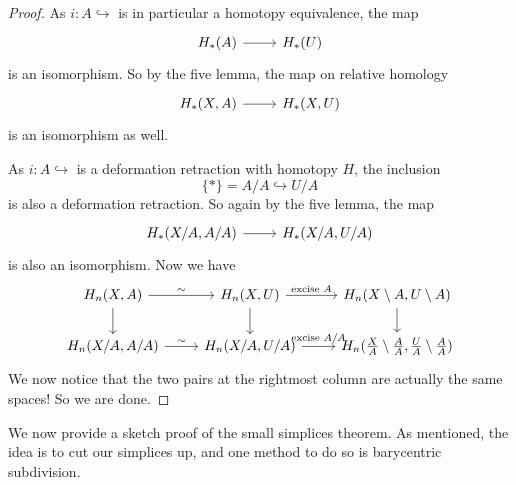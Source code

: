 \documentclass[a4paper]{article}
\begin{document}
\begin{proof}
  As $i: A \hookrightarrow$ is in particular a homotopy equivalence, the map
  \[
    \begin{tikzcd}
      H_*(A) \ar[r] & H_*(U)
    \end{tikzcd}
  \]
  is an isomorphism. So by the five lemma, the map on relative homology
  \[
    \begin{tikzcd}
      H_*(X, A) \ar[r] & H_*(X, U)
    \end{tikzcd}
  \]
  is an isomorphism as well.

  As $i: A \hookrightarrow$ is a deformation retraction with homotopy $H$, the inclusion
  \[
    \{*\} = A/A \hookrightarrow U/A
  \]
  is also a deformation retraction. So again by the five lemma, the map
  \[
    \begin{tikzcd}
      H_*(X/A, A/A) \ar[r] & H_*(X/A, U/A)
    \end{tikzcd}
  \]
  is also an isomorphism. Now we have
  \[
    \begin{tikzcd}
      H_n(X, A) \ar[d] \ar[r, "\sim"] & H_n(X, U) \ar[d] \ar[r, "\text{excise }A"] & H_n(X \setminus A, U \setminus A)\ar[d]\\
      H_n(X/A, A/A) \ar[r, "\sim"] & H_n(X/A, U/A) \ar[r, "\text{excise }A/A"] & H_n(\frac{X}{A}\setminus\frac{A}{A}, \frac{U}{A}\setminus\frac{A}{A})
    \end{tikzcd}
  \]
  We now notice that the two pairs at the rightmost column are actually the same spaces! So we are done.
\end{proof}

We now provide a sketch proof of the small simplices theorem. As mentioned, the idea is to cut our simplices up, and one method to do so is barycentric subdivision.
\end{document}
